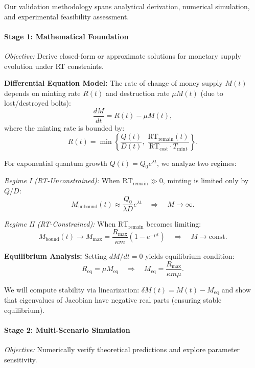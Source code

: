 \documentclass[a4paper,10.5pt,twoside]{article}
\begin{document}
Our validation methodology spans analytical derivation, numerical simulation, and experimental feasibility assessment.

\paragraph{Stage 1: Mathematical Foundation}

\textit{Objective:} Derive closed-form or approximate solutions for monetary supply evolution under RT constraints.

\textbf{Differential Equation Model:}  
The rate of change of money supply $M(t)$ depends on minting rate $R(t)$ and destruction rate $\mu M(t)$ (due to lost/destroyed bolts):
\[
\frac{dM}{dt} = R(t) - \mu M(t),
\]
where the minting rate is bounded by:
\[
R(t) = \min\left\{ \frac{Q(t)}{D(t)}, \; \frac{\text{RT}_{\text{remain}}(t)}{\text{RT}_{\text{cost}} \cdot T_{\text{mint}}} \right\}.
\]

For exponential quantum growth $Q(t) = Q_0 e^{\lambda t}$, we analyze two regimes:

\textit{Regime I (RT-Unconstrained):}  
When $\text{RT}_{\text{remain}} \gg 0$, minting is limited only by $Q/D$:
\[
M_{\text{unbound}}(t) \approx \frac{Q_0}{\lambda D} e^{\lambda t} \quad \Rightarrow \quad M \to \infty.
\]

\textit{Regime II (RT-Constrained):}  
When $\text{RT}_{\text{remain}}$ becomes limiting:
\[
M_{\text{bound}}(t) \to M_{\max} = \frac{R_{\max}}{\kappa m} \left(1 - e^{-\mu t}\right) \quad \Rightarrow \quad M \to \text{const}.
\]

\textbf{Equilibrium Analysis:}  
Setting $dM/dt = 0$ yields equilibrium condition:
\[
R_{\text{eq}} = \mu M_{\text{eq}} \quad \Rightarrow \quad M_{\text{eq}} = \frac{R_{\max}}{\kappa m \mu}.
\]

We will compute stability via linearization: $\delta M(t) = M(t) - M_{\text{eq}}$ and show that eigenvalues of Jacobian have negative real parts (ensuring stable equilibrium).

\paragraph{Stage 2: Multi-Scenario Simulation}

\textit{Objective:} Numerically verify theoretical predictions and explore parameter sensitivity.
\end{document}
